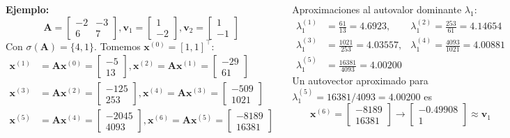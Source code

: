 \documentclass[9pt, aspectratio=169]{beamer}
\begin{document}
\begin{frame}
\begin{columns}[t]
\cx
\textbf{Ejemplo:}
\[ \bm{A} = \begin{bmatrix} -2 & -3 \\ 6 & 7 \end{bmatrix}, \bm{v}_1 = \begin{bmatrix} 1 \\ -2 \end{bmatrix}, \bm{v}_2 = \begin{bmatrix} 1 \\ -1 \end{bmatrix}  \]
Con $\sigma(\bm{A}) = \{4, 1\}$. Tomemos $\bm{x}^{(0)} = [1, 1]^{\intercal}$:
\begin{align*} 
    \bm{x}^{(1)} &= \bm{A} \bm{x}^{(0)} = \begin{bmatrix} -5 \\ 13 \end{bmatrix},  \bm{x}^{(2)} = \bm{A} \bm{x}^{(1)} = \begin{bmatrix} -29 \\ 61 \end{bmatrix} \\
    \bm{x}^{(3)} &= \bm{A} \bm{x}^{(2)} = \begin{bmatrix} -125 \\ 253 \end{bmatrix},  \bm{x}^{(4)} = \bm{A} \bm{x}^{(3)} = \begin{bmatrix} -509 \\ 1021 \end{bmatrix} \\
    \bm{x}^{(5)} &= \bm{A} \bm{x}^{(4)} = \begin{bmatrix} -2045 \\ 4093 \end{bmatrix},  \bm{x}^{(6)} = \bm{A} \bm{x}^{(5)} = \begin{bmatrix} -8189 \\ 16381 \end{bmatrix} 
\end{align*}

\cx
Aproximaciones al autovalor dominante $\lambda_1$:
\begin{align*}
    \lambda_1^{(1)} &= \frac{61}{13} = 4.6923, &\lambda_1^{(2)} = \frac{253}{61} = 4.14654 \\
    \lambda_1^{(3)} &= \frac{1021}{253} = 4.03557, &\lambda_1^{(4)} = \frac{4093}{1021} = 4.00881 \\
 \lambda_1^{(5)} &= \frac{16381}{4093} = 4.00200
\end{align*}
Un autovector aproximado para $\lambda_1^{(5)} = 16381/4093 = 4.00200$ es
\[ \bm{x}^{(6)} = \begin{bmatrix} -8189 \\ 16381 \end{bmatrix} \rightarrow \begin{bmatrix} -0.49908 \\ 1 \end{bmatrix} \approx \bm{v}_1 \]
\end{columns}
\hrulefill \pause


\end{frame}
\end{document}
